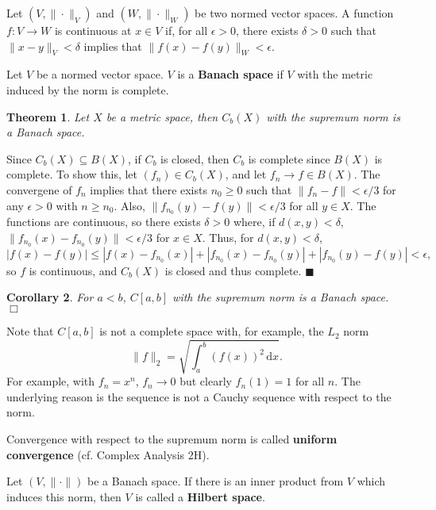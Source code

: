 \documentclass[letter-paper]{tufte-book}
\newtheorem{theorem}{\color{pastel-blue}Theorem}[section]
\newtheorem{corollary}[theorem]{\color{pastel-blue}Corollary}
\newenvironment{proof}[1][Proof]{\begin{trivlist}
\item[\hskip \labelsep {\bfseries #1}]}{\end{trivlist}}
\newcommand{\qed}{\hfill$\blacksquare$}
\newcommand{\qedwhite}{\hfill \ensuremath{\Box}}
\begin{document}
Let $(V, \|\cdot\|_V)$ and $(W, \|\cdot\|_W)$ be two normed vector spaces. A
function $f : V \to W$ is continuous at $x \in V$ if, for all $\epsilon > 0$,
there exists $\delta > 0$ such that $\| x - y\|_V < \delta$ implies that $\|f(x)
- f(y)\|_W < \epsilon$.

Let $V$ be a normed vector space. $V$ is a \textbf{Banach space} if $V$ with
the metric induced by the norm is complete.

\begin{theorem}
  Let $X$ be a metric space, then $C_b(X)$ with the supremum norm is a Banach
  space.
\end{theorem}

\begin{proof}
  Since $C_b(X) \subseteq B(X)$, if $C_b$ is closed, then $C_b$ is complete
  since $B(X)$ is complete. To show this, let $(f_n) \in C_b(X)$, and let $f_n
  \to f \in B(X)$. The convergene of $f_n$ implies that there exists $n_0 \geq
  0$ such that $\|f_n - f\| < \epsilon /3$ for any $\epsilon > 0$ with $n \geq
  n_0$. Also, $\|f_{n_0}(y) - f(y)\| < \epsilon /3$ for all $y \in X$. The
  functions are continuous, so there exists $\delta > 0$ where, if $d(x, y) <
  \delta$, $\|f_{n_0}(x) - f_{n_0}(y)\| < \epsilon /3$ for $x \in X$. Thus, for
  $d(x, y) < \delta$,
  \begin{equation*}
    |f(x) - f(y)| \leq |f(x) - f_{n_0}(x)| + |f_{n_0}(x) - f_{n_0}(y)|
      + |f_{n_0}(y) - f(y)| < \epsilon,
  \end{equation*}
  so $f$ is continuous, and $C_b(X)$ is closed and thus complete. \qed
\end{proof}

\begin{corollary}
  For $a < b$, $C[a,b]$ with the supremum norm is a Banach space. \qedwhite
\end{corollary}

Note that $C[a,b]$ is not a complete space with, for example, the $L_2$ norm
\begin{equation*}
  \| f \|_2 = \sqrt{\int_a^b \left(f(x)\right)^2\, \mathrm{d}x}.
\end{equation*}
For example, with $f_n = x^n$, $f_n \to 0$ but clearly $f_n(1) = 1$ for all $n$.
The underlying reason is the sequence is not a Cauchy sequence with respect to
the norm.

Convergence with respect to the supremum norm is called \textbf{uniform
convergence} (cf. Complex Analysis 2H).

Let $(V, \|\cdot\|)$ be a Banach space. If there is an inner product from $V$
which induces this norm, then $V$ is called a \textbf{Hilbert space}.
\end{document}
